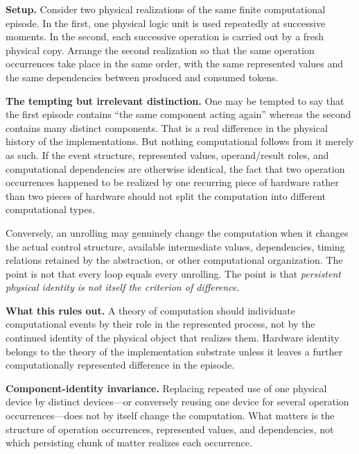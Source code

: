 \documentclass[11pt,a4paper]{article}
\newcounter{thought}
\newenvironment{thoughtbox}[1]{%
  \refstepcounter{thought}%
  \begin{tcolorbox}[
    enhanced,breakable,
    colback=white,colframe=navy,boxrule=0.85pt,
    arc=1.7mm,left=2.8mm,right=2.8mm,top=2.2mm,bottom=2.0mm,
    borderline west={2.2pt}{0pt}{blue},
    title={\large\bfseries Thought experiment \thethought: #1},
    fonttitle=\bfseries,coltitle=navy,
    attach boxed title to top left={xshift=2mm,yshift=-2mm},
    boxed title style={colback=sky,colframe=blue,boxrule=0.55pt,arc=1.2mm},
    before skip=9pt,after skip=10pt
  ]
}{\end{tcolorbox}}
\newcommand{\scene}{\medskip\textbf{Setup.} }
\begin{document}
\begin{thoughtbox}{Hardware reuse and finite unrolling}
\scene Consider two physical realizations of the same finite computational episode. In the first, one physical logic unit is used repeatedly at successive moments. In the second, each successive operation is carried out by a fresh physical copy. Arrange the second realization so that the same operation occurrences take place in the same order, with the same represented values and the same dependencies between produced and consumed tokens.

\medskip\textbf{The tempting but irrelevant distinction.} One may be tempted to say that the first episode contains ``the same component acting again'' whereas the second contains many distinct components. That is a real difference in the physical history of the implementations. But nothing computational follows from it merely as such. If the event structure, represented values, operand/result roles, and computational dependencies are otherwise identical, the fact that two operation occurrences happened to be realized by one recurring piece of hardware rather than two pieces of hardware should not split the computation into different computational types.

Conversely, an unrolling may genuinely change the computation when it changes the actual control structure, available intermediate values, dependencies, timing relations retained by the abstraction, or other computational organization. The point is not that every loop equals every unrolling. The point is that \emph{persistent physical identity is not itself the criterion of difference}.

\medskip\textbf{What this rules out.} A theory of computation should individuate computational events by their role in the represented process, not by the continued identity of the physical object that realizes them. Hardware identity belongs to the theory of the implementation substrate unless it leaves a further computationally represented difference in the episode.

\begin{conceptbox}
\textbf{Component-identity invariance.} Replacing repeated use of one physical device by distinct devices---or conversely reusing one device for several operation occurrences---does not by itself change the computation. What matters is the structure of operation occurrences, represented values, and dependencies, not which persisting chunk of matter realizes each occurrence.
\end{conceptbox}
\end{thoughtbox}
\end{document}
